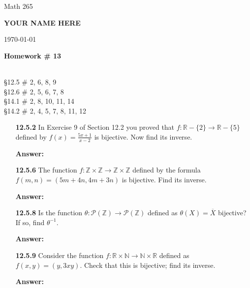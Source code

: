 \documentclass[11pt]{report}
\theoremstyle{plain}
\newcommand{\Z}{\mathbb{Z}}
\newcommand{\R}{\mathbb{R}}
\newcommand{\N}{\mathbb{N}}
\begin{document}
\hfill Math 265

\hfill \textbf{YOUR NAME HERE}

\hfill \today

\begin{center}
\Large{\textbf{Homework \# 13}} \\

\end{center}

\noindent{} \\ \S 12.5 \# 2, 6, 8, 9\\
\S 12.6 \# 2, 5, 6, 7, 8\\
\S 14.1 \# 2, 8, 10, 11, 14 \\
\S 14.2 \# 2, 4, 5, 7, 8, 11, 12\\

\begin{enumerate}
\item[\textbf{12.5.2}] In Exercise 9 of Section 12.2 you proved that $f : \R -\{2\} \to \R - \{5\} $ defined by $f (x) = \frac{5x+1}{x-2}$ is bijective. Now find its inverse.

\textbf{Answer:} \\

\vspace{1in}

\item[\textbf{12.5.6}] The function $f : \Z \times \Z \to \Z \times \Z$  defined by the formula $f (m,n) = (5m+4n,4m+3n)$ is bijective. Find its inverse.

\textbf{Answer:} \\

\vspace{1in}

\item[\textbf{12.5.8}] Is the function $\theta : \mathcal{P}(\Z) \to \mathcal{P}(\Z)$ defined as $\theta(X) = \overline{X}$ bijective? If so, find $\theta^{-1}.$

\textbf{Answer:} \\

\vspace{1in}

\item[\textbf{12.5.9}] Consider the function $f : \R \times \N \to \N \times \R$ defined as $f (x, y) = (y,3x y).$ Check that this
is bijective; find its inverse.

\textbf{Answer:} \\


\end{enumerate}
\end{document}

